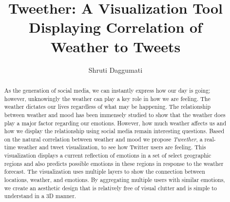 \documentclass[print]{nuthesis}
\begin{document}
\frontmatter

\title{Tweether: A Visualization Tool Displaying Correlation of \\Weather to Tweets}
\author{Shruti Daggumati}
\maketitle
\begin{abstract}
As the generation of social media, we can instantly express how our day is going; however, unknowingly the weather can play a key role in how we are feeling. The weather dictates our lives regardless of what may be happening. The relationship between weather and mood has been immensely studied to show that the weather does play a major factor regarding our emotions. However, how much weather affects us and how we display the relationship using social media remain interesting questions. Based on the natural correlation between weather and mood we propose \emph{Tweether}, a real-time weather and tweet visualization, to see how Twitter users are feeling. This visualization displays a current reflection of emotions in a set of select geographic regions and also predicts possible emotions in these regions in response to the weather forecast. The visualization uses multiple layers to show the connection between locations, weather, and emotions. By aggregating multiple users with similar emotions, we create an aesthetic design that is relatively free of visual clutter and is simple to understand in a 3D manner.
\end{abstract}

\end{document}
